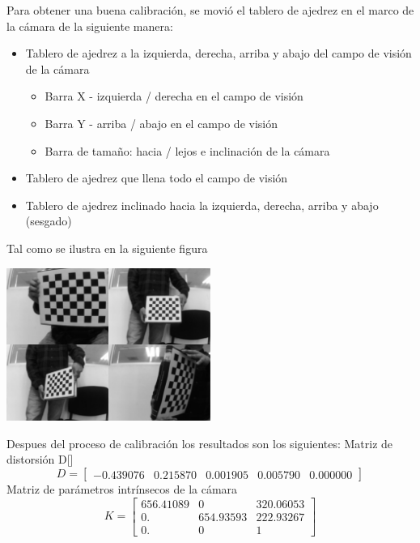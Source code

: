 Para obtener una buena calibración, se movió el tablero de ajedrez en el marco de la cámara de
la siguiente manera:
\begin{itemize}
	\item Tablero de ajedrez a la izquierda, derecha, arriba y abajo del campo de visión de la cámara
	      \begin{itemize}
		      \item Barra X - izquierda / derecha en el campo de visión
		      \item Barra Y - arriba / abajo en el campo de visión
		      \item Barra de tamaño: hacia / lejos e inclinación de la cámara
	      \end{itemize}
	\item Tablero de ajedrez que llena todo el campo de visión
	\item Tablero de ajedrez inclinado hacia la izquierda, derecha, arriba y abajo (sesgado)
\end{itemize}
Tal como se ilustra en la siguiente figura
\begin{center}
	\includegraphics[width=0.5\textwidth]{Contenido/Cuerpo/Capitulo4/Fig12.eps}
	\label{Fig1}
\end{center}
Despues del proceso de calibración los resultados son los siguientes:
Matriz de distorsión D[]
\begin{equation}
	D=
	\begin{bmatrix}
		-0.439076 & 0.215870 & 0.001905 & 0.005790 & 0.000000
	\end{bmatrix}
\end{equation}
Matriz de parámetros intrínsecos de la cámara
\begin{equation}
	K=
	\begin{bmatrix}
		656.41089 & 0         & 320.06053 \\
		0.        & 654.93593 & 222.93267 \\
		0.        & 0         & 1
	\end{bmatrix}
\end{equation}

